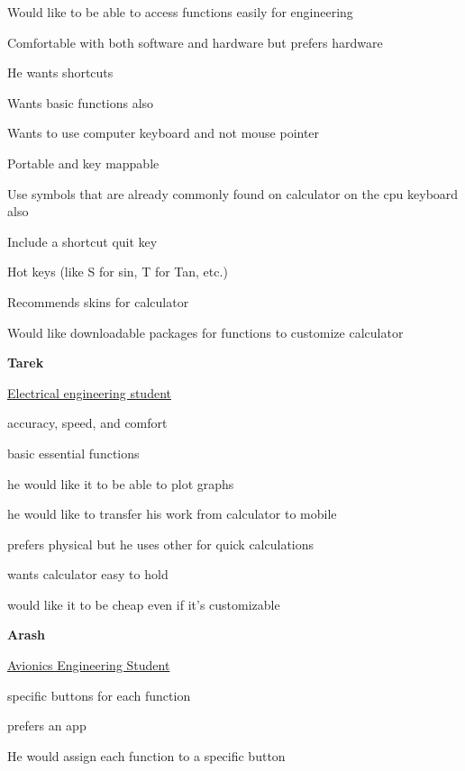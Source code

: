 \documentclass[a4paper]{article}
\begin{document}
\begin{compactitem}
\item Would like to be able to access functions easily for engineering 
\item Comfortable with both software and hardware but prefers hardware
\item He wants shortcuts
\item Wants basic functions also
\item Wants to use computer keyboard and not mouse pointer
\item Portable and key mappable
\item Use symbols that are already commonly found on calculator on the cpu keyboard also 
\item Include a shortcut quit key
\item Hot keys (like S for sin, T for Tan, etc.)
\item Recommends skins for calculator
\item Would like downloadable packages for functions to customize calculator
\end{compactitem}
\bigskip

\textbf{Tarek}

\underline{Electrical engineering student}

\begin{compactitem}
\item accuracy, speed, and comfort
\item basic essential functions
\item he would like it to be able to plot graphs 
\item he would like to transfer his work from calculator to mobile
\item prefers physical but he uses other for quick calculations
\item wants calculator easy to hold
\item would like it to be cheap even if it’s customizable
\end{compactitem}
\bigskip

\textbf{Arash}

\underline{Avionics Engineering Student}

\begin{compactitem}
\item specific buttons for each function
\item prefers an app 
\item He would assign each function to a specific button
\end{compactitem}
\end{document}
